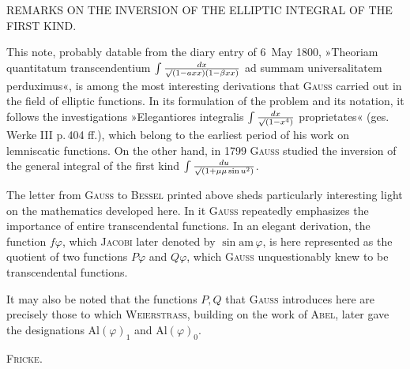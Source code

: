 %

\begin{center}
REMARKS ON THE INVERSION OF THE ELLIPTIC INTEGRAL OF THE FIRST KIND.
\end{center}

\noindent\hspace*{\parindent}This note, probably datable from the diary entry of 6\ May 1800, »Theoriam quantitatum transcendentium $\int\frac{dx}{\mathord{\surd}(1-a xx)(1-\beta xx)}$ ad summam universalitatem perduximus«, is among the most interesting derivations that \textsc{Gauss} carried out in the field of elliptic functions. In its formulation of the problem and its notation, it follows the investigations »Elegantiores integralis $\int\frac{dx}{\mathord{\surd}(1-x^4)}$ proprietates« (ges. Werke III p.\,404 ff.), which belong to the earliest period of his work on lemniscatic functions. On the other hand, in 1799 \textsc{Gauss} studied the inversion of the general integral of the first kind $\int\frac{du}{\mathord{\surd}(1+\mu\mu\sin u^2)}$.

The letter from \textsc{Gauss} to \textsc{Bessel} printed above sheds particularly interesting light on the mathematics developed here. In it \textsc{Gauss} repeatedly emphasizes the importance of entire transcendental functions. In an elegant derivation, the function $f\varphi$, which \textsc{Jacobi} later denoted by $\sin\mathrm{am}\,\varphi$, is here represented as the quotient of two functions $P\varphi$ and $Q\varphi$, which \textsc{Gauss} unquestionably knew to be  transcendental functions.

It may also be noted that the functions $P, Q$ that \textsc{Gauss} introduces here are precisely those to which \textsc{Weierstrass}, building on the work of \textsc{Abel}, later gave the designations $\mathrm{Al}(\varphi)_1$ and $\mathrm{Al}(\varphi)_0$.

\hfill \textsc{Fricke}.

\bigskip

